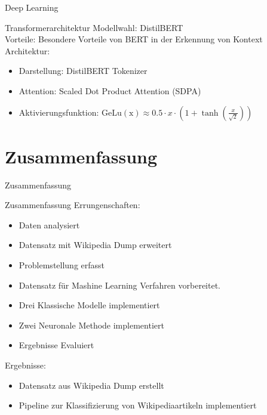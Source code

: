 \documentclass[aspectratio=169]{beamer} %
\begin{document}
\begin{frame}{Deep Learning}
    \begin{block}{Transformerarchitektur}
        Modellwahl: DistilBERT \\
        Vorteile: Besondere Vorteile von BERT in der Erkennung von Kontext \\
        Architektur:
        \begin{itemize}
            \item Darstellung: DistilBERT Tokenizer
            \item Attention: Scaled Dot Product Attention (SDPA)
            \item Aktivierungsfunktion: $\operatorname{GeLu(x)} \approx {0.5 \cdot x \cdot (1+ \tanh({\frac{x}{\sqrt{2}}}))} $
        \end{itemize}
    \end{block}
\end{frame}

\section{Zusammenfassung}

\begin{frame}{Zusammenfassung}
    \begin{block}{Zusammenfassung}
        Errungenschaften:
        \begin{itemize}
            \item Daten analysiert
            \item Datensatz mit Wikipedia Dump erweitert
            \item Problemstellung erfasst
            \item Datensatz für Mashine Learning Verfahren vorbereitet.
            \item Drei Klassische Modelle implementiert
            \item Zwei Neuronale Methode implementiert
            \item Ergebnisse Evaluiert
        \end{itemize}
        Ergebnisse:
        \begin{itemize}
            \item Datensatz aus Wikipedia Dump erstellt
            \item Pipeline zur Klassifizierung von Wikipediaartikeln implementiert
        \end{itemize}
    \end{block}
\end{frame}
\end{document}
